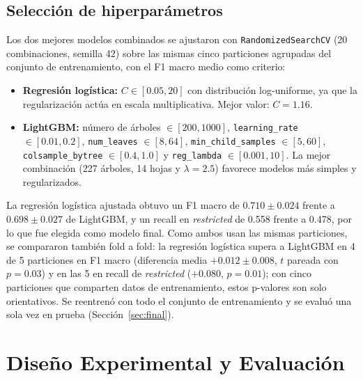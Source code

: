 \documentclass[conference]{IEEEtran}
\begin{document}
\subsection{Selección de hiperparámetros}\label{sec:hiper}
Los dos mejores modelos combinados se ajustaron con \texttt{RandomizedSearchCV} (20 combinaciones, semilla 42) sobre las mismas cinco particiones agrupadas del conjunto de entrenamiento, con el F1 macro medio como criterio:
\begin{itemize}
\item \textbf{Regresión logística:} $C \in [0.05, 20]$ con distribución log-uniforme, ya que la regularización actúa en escala multiplicativa. Mejor valor: $C=1.16$.
\item \textbf{LightGBM:} número de árboles $\in [200, 1000]$, \texttt{learning\_rate} $\in [0.01, 0.2]$, \texttt{num\_leaves} $\in [8, 64]$, \texttt{min\_child\_samples} $\in [5, 60]$, \texttt{colsample\_bytree} $\in [0.4, 1.0]$ y \texttt{reg\_lambda} $\in [0.001, 10]$. La mejor combinación (227 árboles, 14 hojas y $\lambda=2.5$) favorece modelos más simples y regularizados.
\end{itemize}
La regresión logística ajustada obtuvo un F1 macro de $0.710 \pm 0.024$ frente a $0.698 \pm 0.027$ de LightGBM, y un recall en \textit{restricted} de 0.558 frente a 0.478, por lo que fue elegida como modelo final. Como ambos usan las mismas particiones, se compararon también fold a fold: la regresión logística supera a LightGBM en 4 de 5 particiones en F1 macro (diferencia media $+0.012 \pm 0.008$, $t$ pareada con $p=0.03$) y en las 5 en recall de \textit{restricted} ($+0.080$, $p=0.01$); con cinco particiones que comparten datos de entrenamiento, estos p-valores son solo orientativos. Se reentrenó con todo el conjunto de entrenamiento y se evaluó una sola vez en prueba (Sección~\ref{sec:final}).

\section{Diseño Experimental y Evaluación}\label{sec:diseno}

\end{document}
